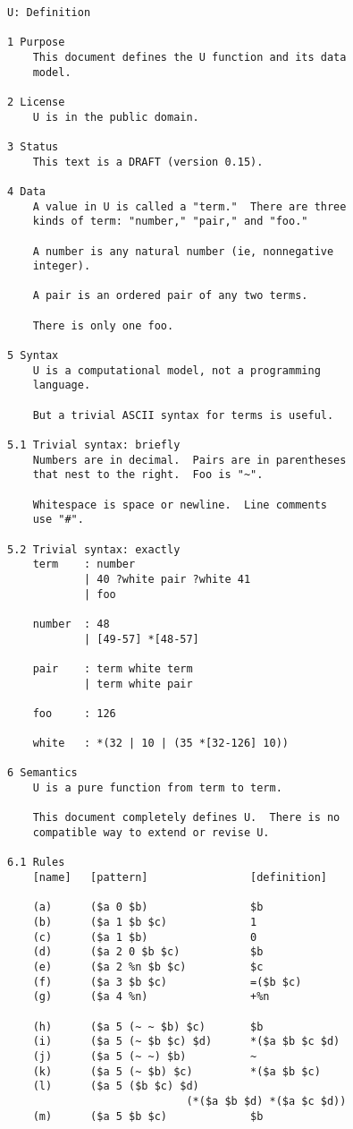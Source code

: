 \documentclass[twoside]{article}
\begin{document}
\begin{lstlisting}[label=lst:u,caption={U, 31 January 2006.  The earliest extant patriarch of the Nock family.},style=listingcode]
U: Definition

1 Purpose
    This document defines the U function and its data
    model.

2 License
    U is in the public domain.

3 Status
    This text is a DRAFT (version 0.15).

4 Data
    A value in U is called a "term."  There are three
    kinds of term: "number," "pair," and "foo."

    A number is any natural number (ie, nonnegative
    integer).

    A pair is an ordered pair of any two terms.

    There is only one foo.

5 Syntax
    U is a computational model, not a programming
    language.

    But a trivial ASCII syntax for terms is useful.

5.1 Trivial syntax: briefly
    Numbers are in decimal.  Pairs are in parentheses
    that nest to the right.  Foo is "~".

    Whitespace is space or newline.  Line comments
    use "#".

5.2 Trivial syntax: exactly
    term    : number
            | 40 ?white pair ?white 41
            | foo

    number  : 48
            | [49-57] *[48-57]

    pair    : term white term
            | term white pair

    foo     : 126

    white   : *(32 | 10 | (35 *[32-126] 10))

6 Semantics
    U is a pure function from term to term.

    This document completely defines U.  There is no
    compatible way to extend or revise U.

6.1 Rules
    [name]   [pattern]                [definition]

    (a)      ($a 0 $b)                $b
    (b)      ($a 1 $b $c)             1
    (c)      ($a 1 $b)                0
    (d)      ($a 2 0 $b $c)           $b
    (e)      ($a 2 %n $b $c)          $c
    (f)      ($a 3 $b $c)             =($b $c)
    (g)      ($a 4 %n)                +%n

    (h)      ($a 5 (~ ~ $b) $c)       $b
    (i)      ($a 5 (~ $b $c) $d)      *($a $b $c $d)
    (j)      ($a 5 (~ ~) $b)          ~
    (k)      ($a 5 (~ $b) $c)         *($a $b $c)
    (l)      ($a 5 ($b $c) $d)
                            (*($a $b $d) *($a $c $d))
    (m)      ($a 5 $b $c)             $b


\end{lstlisting}
\end{document}
